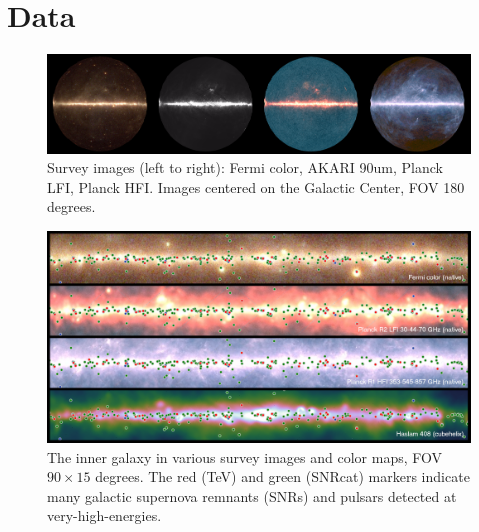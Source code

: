 \renewcommand{\thefootnote}{\arabic{footnote}}

\section{Data}

\begin{figure}[tb]
  \centerline{\includegraphics[width=\textwidth]{figures/four_images}}
  \caption{Survey images (left to right): Fermi color, AKARI 90um, Planck LFI, Planck HFI. Images centered on the Galactic Center, FOV 180 degrees.}
  \label{fig:four_images}
\end{figure}



\begin{figure}[tb]
  \centerline{\includegraphics[width=\textwidth]{figures/galactic_region_NEW}}
  \caption{The inner galaxy in various survey images and color maps, FOV $90 \times 15$ degrees. The red (TeV) and green (SNRcat) markers indicate many galactic supernova remnants (SNRs) and pulsars detected at very-high-energies.}
  \label{fig:galactic}
\end{figure}

